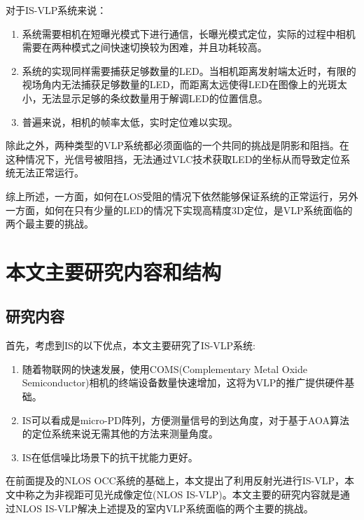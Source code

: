 对于IS-VLP系统来说：
\begin{enumerate}[topsep = 0 pt, itemsep= 0 pt, parsep=0pt, partopsep=0pt, leftmargin=20pt, itemindent=0pt, labelsep=6pt, label={(\arabic*)}] 

    \item 系统需要相机在短曝光模式下进行通信，长曝光模式定位，实际的过程中相机需要在两种模式之间快速切换较为困难，并且功耗较高。
    \item 系统的实现同样需要捕获足够数量的LED。当相机距离发射端太近时，有限的视场角内无法捕获足够数量的LED，而距离太远使得LED在图像上的光斑太小，无法显示足够的条纹数量用于解调LED的位置信息。
    \item 普遍来说，相机的帧率太低，实时定位难以实现。
\end{enumerate}

 除此之外，两种类型的VLP系统都必须面临的一个共同的挑战是阴影和阻挡。在这种情况下，光信号被阻挡，无法通过VLC技术获取LED的坐标从而导致定位系统无法正常运行。
 
 综上所述，一方面，如何在LOS受阻的情况下依然能够保证系统的正常运行，另外一方面，如何在只有少量的LED的情况下实现高精度3D定位，是VLP系统面临的两个最主要的挑战。



\section{本文主要研究内容和结构}
\subsection{研究内容}
首先，考虑到IS的以下优点，本文主要研究了IS-VLP系统:
\begin{enumerate}[topsep = 0 pt, itemsep= 0 pt, parsep=0pt, partopsep=0pt, leftmargin=20pt, itemindent=0pt, labelsep=6pt, label={(\arabic*)}] 

    \item 随着物联网的快速发展，使用COMS(Complementary Metal Oxide Semiconductor)相机的终端设备数量快速增加，这将为VLP的推广提供硬件基础。
    \item IS可以看成是micro-PD阵列，方便测量信号的到达角度，对于基于AOA算法的定位系统来说无需其他的方法来测量角度。
    \item IS在低信噪比场景下的抗干扰能力更好。
\end{enumerate}
在前面提及的NLOS OCC系统的基础上，本文提出了利用反射光进行IS-VLP，本文中称之为非视距可见光成像定位(NLOS IS-VLP)。本文主要的研究内容就是通过NLOS IS-VLP解决上述提及的室内VLP系统面临的两个主要的挑战。


